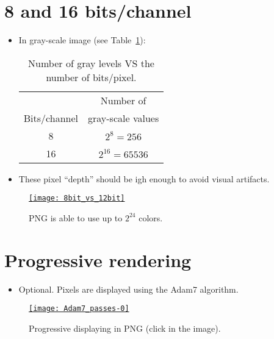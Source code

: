 \section{8 and 16 bits/channel}
\begin{itemize}
\item In gray-scale image (see Table~\ref{tab:gray_levels}):
  \begin{table}[!h]
    \vspace{2ex}
    \begin{center}
      \begin{tabular}{c|c}
        & Number of \\
        Bits/channel & gray-scale values \\
        \hline
        8 & $2^8=256$ \\
        16 & $2^{16}=65536$
      \end{tabular}
    \vspace{2ex}
    \end{center}
    \caption{Number of gray levels VS the number of bits/pixel.}
    \label{tab:gray_levels}
  \end{table}
  \newpage
\item These pixel ``depth'' should be igh enough to avoid visual artifacts.
\end{itemize}
\begin{figure}[H]
  \vspace{-2ex}
  \centering
    \href{https://www.fastcompression.com/blog/jpeg2000-applications-part1.htm}{\texttt{[image: 8bit\_vs\_12bit]}}
  \caption{\gls{PNG} is able to use up to $2^{24}$ colors.}
  \label{fig:PNG_colors}
\end{figure}

\section{Progressive rendering}
\begin{itemize}
\item Optional. Pixels are displayed using the Adam7 algorithm.
\end{itemize}
\begin{figure}[H]
  \vspace{-2ex}
  \centering
  \href{https://upload.wikimedia.org/wikipedia/commons/2/27/Adam7_passes.gif}{\texttt{[image: Adam7\_passes-0]}}
  \caption{Progressive displaying in \gls{PNG} (click in the image).}
  \label{fig:PNG_progressive}
\end{figure}
  

